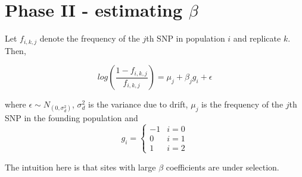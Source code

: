 \documentclass[10pt,a4paper,draft]{article}
\begin{document}
\section{Phase II - estimating $\beta$}
Let $f_{i,k,j}$ denote the frequency of the $j$th SNP in population $i$ and replicate $k$. Then,

\begin{equation}
log(\frac{1-f_{i,k,j}}{f_{i,k,j}}) = \mu_j + \beta_{j} g_i + \epsilon
\end{equation}

where $\epsilon \sim N_(0, \sigma_d^2)$, $\sigma_d^2$ is the variance due to drift, $\mu_j$ is the frequency of the $j$th SNP in the founding population and 
\[
   g_{i} = \left\{
     \begin{array}{lr}
       -1 &  i =0\\
        0 &  i =1 \\
        1 &  i =2
     \end{array}
   \right.
\]

The intuition here is that sites with large $\beta$ coefficients are under selection.
\end{document}
